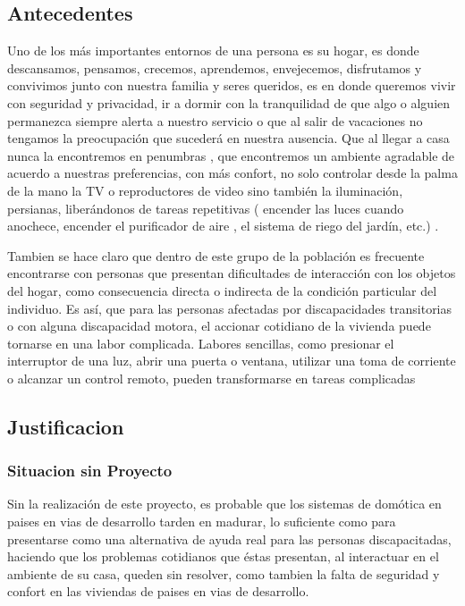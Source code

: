 \documentclass[letterpaper,12pt]{article}
\begin{document}
{		\subsection{Antecedentes}
		
		Uno de los más importantes entornos de una persona es su hogar, es donde  descansamos,  pensamos, crecemos, aprendemos,  envejecemos, disfrutamos y convivimos  junto con nuestra familia y seres queridos, es en donde queremos  vivir con seguridad y privacidad, ir  a dormir  con la tranquilidad de que algo o alguien permanezca siempre alerta a nuestro servicio o que al  salir de vacaciones no tengamos la preocupación que sucederá en nuestra ausencia.  Que al llegar a casa  nunca la encontremos en penumbras , que  encontremos un ambiente agradable de acuerdo a nuestras preferencias,  con más confort,    no solo controlar desde la palma de la mano la TV o reproductores de video  sino también  la iluminación, persianas, liberándonos de tareas repetitivas ( encender las luces cuando anochece,  encender el  purificador de aire , el sistema de riego del jardín, etc.) .
		
		Tambien se hace claro que dentro de este grupo de la población es frecuente encontrarse con personas que presentan  dificultades de interacción con los objetos del hogar, como consecuencia directa o indirecta de la condición particular del individuo. Es así, que para las personas afectadas por discapacidades transitorias  o  con alguna discapacidad motora, el accionar cotidiano de la vivienda puede tornarse en una labor complicada. Labores sencillas, como presionar el interruptor de una luz, abrir una puerta o ventana, utilizar una toma de corriente o alcanzar un control remoto, pueden transformarse en tareas complicadas 
		
		
		
		
		\subsection{Justificacion}
		
		\subsubsection{Situacion sin Proyecto}
		
		Sin la realización de este proyecto, es probable que los sistemas de domótica  en paises en vias de desarrollo tarden en madurar, lo suficiente como para presentarse como una alternativa de ayuda real para las personas discapacitadas, haciendo que los problemas cotidianos que éstas presentan, al interactuar en el ambiente de su casa, queden sin resolver, como tambien la falta de seguridad y confort en las viviendas de paises en vias de desarrollo.
		
}
\end{document}
